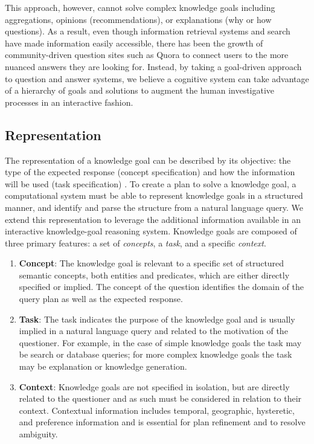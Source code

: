 \documentclass[letterpaper]{article}
\begin{document}
This approach, however, cannot solve complex knowledge goals including aggregations, opinions (recommendations), or explanations (why or how questions). As a result, even though information retrieval systems and search have made information easily accessible, there has been the growth of community-driven question sites such as Quora \cite{wang_wisdom_2013} to connect users to the more nuanced answers they are looking for. Instead, by taking a goal-driven approach to question and answer systems, we believe a cognitive system can take advantage of a hierarchy of goals and solutions to augment the human investigative processes in an interactive fashion.

\subsection{Representation}

The representation of a knowledge goal can be described by its objective: the type of the expected response (concept specification) and how the information will be used (task specification) \cite{ram_theory_1991}. To create a plan to solve a knowledge goal, a computational system must be able to represent knowledge goals in a structured manner, and identify and parse the structure from a natural language query. We extend this representation to leverage the additional information available in an interactive knowledge-goal reasoning system. Knowledge goals are composed of three primary features: a set of \textit{concepts}, a \textit{task}, and a specific \textit{context}.

\begin{enumerate}

\item \textbf{Concept}: The knowledge goal is relevant to a specific set of structured semantic concepts, both entities and predicates, which are either directly specified or implied. The concept of the question identifies the domain of the query plan as well as the expected response.

\item \textbf{Task}: The task indicates the purpose of the knowledge goal and is usually implied in a natural language query and related to the motivation of the questioner. For example, in the case of simple knowledge goals the task may be search or database queries; for more complex knowledge goals the task may be explanation or knowledge generation.

\item \textbf{Context}: Knowledge goals are not specified in isolation, but are directly related to the questioner and as such must be considered in relation to their context. Contextual information includes temporal, geographic, hysteretic, and preference information and is essential for plan refinement and to resolve ambiguity.
\end{enumerate}
\end{document}
